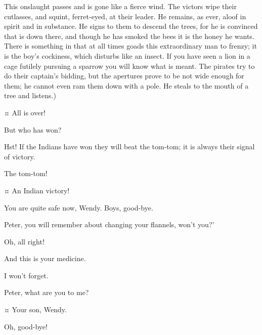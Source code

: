 \begin{drama}
\begin{stagedir}
This onslaught passes and is gone like a fierce wind.
The victors wipe their cutlasses, and squint, ferret-eyed, at their leader.
He remains, as ever, aloof in spirit and in substance.
He signs to them to descend the trees, for he is convinced that \pan is down there,
and though he has smoked the bees it is the honey he wants.
There is something in \peter that at all times goads this extraordinary man to frenzy;
it is the boy's cockiness, which disturbs \hook like an insect.
If you have seen a lion in a cage futilely pursuing a sparrow you will know what is meant.
The pirates try to do their captain's bidding, but the apertures prove to be not wide enough for them;
he cannot even ram them down with a pole.
He steals to the mouth of a tree and listens.)
\end{stagedir}

\peterspeaks {}¤
All is over!

\wendyspeaks
But who has won?

\peterspeaks
Hst!
If the Indians have won they will beat the tom-tom; it is always their signal of victory.


\tootlesspeaks
The tom-tom!

\peterspeaks {}¤
An Indian victory!


\speakercontinues
You are quite safe now, Wendy.
Boys, good-bye.

\wendyspeaks
Peter, you will remember about changing your flannels, won't you?'

\peterspeaks
Oh, all right!

\wendyspeaks
And this is your medicine.


\peterspeaks
I won't forget.

\wendyspeaks
Peter, what are you to me?

\peterspeaks {}¤
Your son, Wendy.

\wendyspeaks
Oh, good-bye!

\end{drama}
